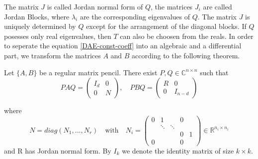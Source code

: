 The matrix $J$ is called Jordan normal form of $Q$, the matrices $J_i$ are called Jordan Blocks, where $\lambda_i$ are the corresponding eigenvalues of $Q$. The matrix $J$ is uniquely determined by $Q$ except for the arrangement of the diagonal blocks. If $Q$ posesses only real eigenvalues, then $T$ can also be choosen from the reals. \newline
In order to seperate the equation \eqref{DAE-const-coeff} into an algebraic and a differential part, we transform the matrices $A$ and $B$ according to the following theorem.
\begin{theorem}
	\label{Kronecker-Normalform}
	Let $\{ A,B \}$ be a regular matrix pencil. There exist $P,Q \in \mathbb{C}^{n \times n}$ such that
	\begin{displaymath}
		PAQ = 
		\left(
		\begin{matrix}
			I_d & 0 \\
			0 & N 
		\end{matrix}
		\right), \quad
		PBQ = 
		\left(
		\begin{matrix}
			R & 0 \\
			0 & I_{n-d}
		\end{matrix}
		\right)
	\end{displaymath}

	where
	\begin{displaymath}
		N = diag(N_1, ..., N_r) \quad \text{with} \quad N_i = 
		\left(
		\begin{matrix}
			0 & 1 & & 0\\
			& \ddots &\ddots & \\
			& & & 0 & 1 \\
			0 & & & 0
		\end{matrix}
		\right)
		\in \mathbb{R}^{n_i \times n_i}
	\end{displaymath}
	and R has Jordan normal form. By $I_k$ we denote the identity matrix of size $k \times k$.
\end{theorem}

